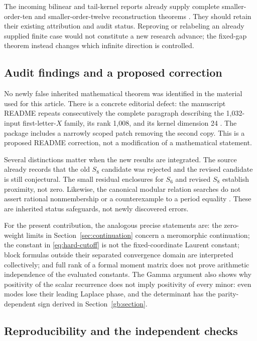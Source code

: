 The incoming bilinear and tail-kernel reports already supply complete
smaller-order-ten and smaller-order-twelve reconstruction
theorems \cite{repo:bilinear,repo:tail-kernels}. They should
retain their existing attribution and audit status. Reproving or
relabeling an already supplied finite case would not constitute a
new research advance; the fixed-gap theorem instead changes which
infinite direction is controlled.

\subsection{Audit findings and a proposed correction}

No newly false inherited mathematical theorem was identified in the
material used for this article. There is a concrete editorial defect:
the manuscript README repeats consecutively the complete paragraph
describing the 1,032-input first-letter-$X$ family, its rank 1,008,
and its kernel dimension 24 \cite{repo:manuscript}. The package includes
a narrowly scoped patch removing the second copy. This is a proposed
README correction, not a modification of a mathematical statement.

Several distinctions matter when the new results are integrated.
The source already records that the old $S_8$ candidate was rejected
and the revised candidate is still conjectural. The small residual
enclosures for $S_6$ and revised $S_8$ establish proximity, not zero.
Likewise, the canonical modular relation searches do not assert
rational nonmembership or a counterexample to a period equality
\cite{repo:ledger,repo:gaussian}. These are inherited status safeguards,
not newly discovered errors.

For the present contribution, the analogous precise statements are:
the zero-weight limits in Section~\ref{sec:continuation} concern a
meromorphic continuation; the constant in \eqref{eq:hard-cutoff} is
not the fixed-coordinate Laurent constant; block formulas outside
their separated convergence domain are interpreted collectively;
and full rank of a formal moment matrix does not prove arithmetic
independence of the evaluated constants. The Gamma argument also
shows why positivity of the scalar recurrence does not imply
positivity of every minor: even modes lose their leading Laplace
phase, and the determinant has the parity-dependent sign derived
in Section~\ref{gb:section}.

\subsection{Reproducibility and the independent checks}

